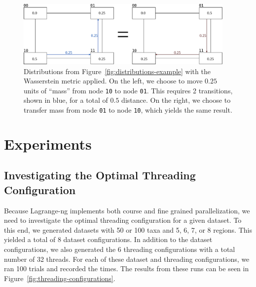 \documentclass{article}
\begin{document}
\begin{figure}
  \begin{center}
    \includegraphics[width=0.95\textwidth]{figures/example-earthmovers.pdf}
  \end{center}
  \caption{Distributions from Figure~\ref{fig:distributions-example} with the Wasserstein metric applied. On the left,
    we choose to move $0.25$ units of ``mass'' from node \texttt{10} to node \texttt{01}. This requires 2 transitions,
    shown in blue, for a total of $0.5$ distance. On the right, we choose to transfer mass from node \texttt{01} to node
    \texttt{10}, which yields the same result.}
  \label{fig:earthmovers-example}
\end{figure}


\section{Experiments}
\label{sec:experiments}

\subsection{Investigating the Optimal Threading Configuration}

Because Lagrange-ng implements both course and fine grained parallelization, we need to investigate the optimal
threading configuration for a given dataset. To this end, we generated datasets with 50 or 100 taxa and 5, 6, 7, or 8
regions. This yielded a total of 8 dataset configurations. In addition to the dataset configurations, we also generated
the 6 threading configurations with a total number of 32 threads. For each of these dataset and threading
configurations, we ran 100 trials and recorded the times. The results from these runs can be seen in
Figure~\ref{fig:threading-configurations}.
\end{document}
